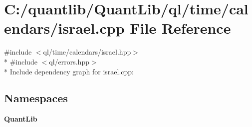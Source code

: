 \section{C\+:/quantlib/\+Quant\+Lib/ql/time/calendars/israel.cpp File Reference}
\label{israel_8cpp}
{\ttfamily \#include $<$ql/time/calendars/israel.\+hpp$>$}\\*
{\ttfamily \#include $<$ql/errors.\+hpp$>$}\\*
Include dependency graph for israel.\+cpp\+:
\subsection*{Namespaces}
\begin{DoxyCompactItemize}
\item 
 {\bf Quant\+Lib}
\end{DoxyCompactItemize}
